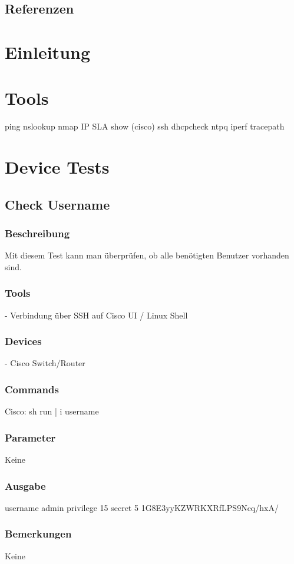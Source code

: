 \documentclass[a4,12pt]{scrartcl}
\begin{document}
\subsection{Referenzen}

\newpage
\section{Einleitung}

\newpage
\section{Tools}

ping
nslookup
nmap
IP SLA
show (cisco)
ssh
dhcpcheck
ntpq
iperf
tracepath
\newpage
\section{Device Tests}

\subsection{Check Username}
\subsubsection{Beschreibung}
Mit diesem Test kann man überprüfen, ob alle benötigten Benutzer vorhanden sind.
\subsubsection{Tools}
- Verbindung über SSH auf Cisco UI / Linux Shell
\subsubsection{Devices}
- Cisco Switch/Router
\subsubsection{Commands}
Cisco: sh run | i username
\subsubsection{Parameter}
Keine
\subsubsection{Ausgabe}
username admin privilege 15 secret 5 1G8E3yyKZWRKXRfLPS9Ncq/hxA/
\subsubsection{Bemerkungen}
Keine
\end{document}
